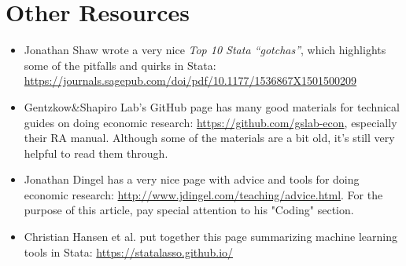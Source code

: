 \section{Other Resources}
\begin{itemize}
    \item Jonathan Shaw wrote a very nice \textit{Top 10 Stata ``gotchas''}, which highlights some of the pitfalls and quirks in Stata: \url{https://journals.sagepub.com/doi/pdf/10.1177/1536867X1501500209}
    \item Gentzkow\&Shapiro Lab's GitHub page has many good materials for technical guides on doing economic research: \url{https://github.com/gslab-econ}, especially their RA manual. Although some of the materials are a bit old, it's still very helpful to read them through. 
    \item Jonathan Dingel has a very nice page with advice and tools for doing economic research: \url{http://www.jdingel.com/teaching/advice.html}. For the purpose of this article, pay special attention to his "Coding" section. 
    \item Christian Hansen et al. put together this page summarizing machine learning tools in Stata: \url{https://statalasso.github.io/}
\end{itemize}